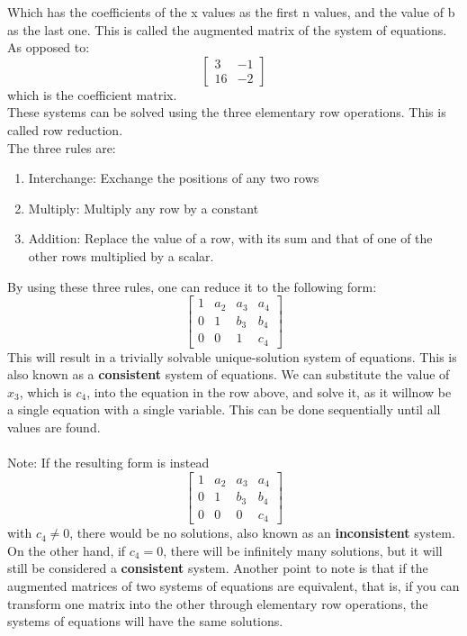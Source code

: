 \documentclass[nobib]{tufte-handout}
\begin{document}
Which has the coefficients of the x values as the first n values, and the value of b as the last one. This is called the augmented matrix of the system of equations. As opposed to:
\begin{equation*}
  \begin{bmatrix}
    3 & -1\\
    16 & -2
 \end{bmatrix}  
\end{equation*}
which is the coefficient matrix.\\
These systems can be solved using the three elementary row operations. This is called row reduction.\\
The three rules are:
\begin{enumerate}
    \item Interchange: Exchange the positions of any two rows
    \item Multiply: Multiply any row by a constant
    \item Addition: Replace the value of a row, with its sum and that of one of the other rows multiplied by a scalar.
\end{enumerate}
By using these three rules, one can reduce it to the following form:
\begin{equation*}
  \begin{bmatrix}
    1 & a_2 & a_3 & a_4\\
    0 & 1 & b_3 & b_4 \\
    0 & 0 & 1 & c_4
 \end{bmatrix}  
\end{equation*}
This will result in a trivially solvable unique-solution system of equations. This is also known as a \textbf{consistent} system of equations. We can substitute the value of $x_3$, which is $c_4$, into the equation in the row above, and solve it, as it willnow be a single equation with a single variable. This can be done sequentially until all values are found.\\~\\
Note: If the resulting form is instead
\begin{equation*}
  \begin{bmatrix}
    1 & a_2 & a_3 & a_4\\
    0 & 1 & b_3 & b_4 \\
    0 & 0 & 0 & c_4
 \end{bmatrix}  
\end{equation*}
with $c_4 \neq 0$, there would be no solutions, also known as an \textbf{inconsistent} system. On the other hand, if $c_4 = 0$, there will be infinitely many solutions, but it will still be considered a \textbf{consistent} system.
Another point to note is that if the augmented matrices of two systems of equations are equivalent,
that is, if you can transform one matrix into the other through elementary row operations, the systems of equations will have the same solutions.
\pagebreak
\end{document}
